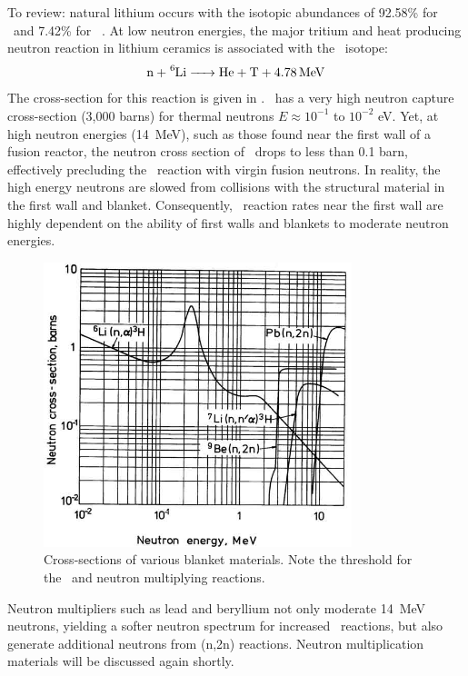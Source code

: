 \documentclass[11pt]{report} %
\newcommand{\lisev}{\ce{^7Li}}
\newcommand{\lisix}{\ce{^6Li}}
\begin{document}
To review: natural lithium occurs with the isotopic abundances of 92.58\% for \lisev~and 7.42\% for \lisix~. At low neutron energies, the major tritium and heat producing neutron reaction in lithium ceramics is associated with the \lisix~isotope:
\begin{align}
\ce{n + ^6Li -> He + T} + \SI{4.78}{\mega\electronvolt} \label{eq:Li6T}
\end{align}
The cross-section for this reaction is given in . \lisix~has a very high neutron capture cross-section (3,000 barns) for thermal neutrons $E \approx 10^{-1}$ to $10^{-2}$ eV. Yet, at high neutron energies (\SI{14}{\mega\electronvolt}), such as those found near the first wall of a fusion reactor, the neutron cross section of \lisix~drops to less than 0.1 barn, effectively precluding the \lisix~reaction with virgin fusion neutrons. In reality, the high energy neutrons are slowed from collisions with the structural material in the first wall and blanket. Consequently, \lisix~reaction rates near the first wall are highly dependent on the ability of first walls and blankets to moderate neutron energies.

\begin{figure}[ht]
\centering
\includegraphics[width=0.8\textwidth]{../images/breeding_xsecs} 
\caption{Cross-sections of various blanket materials. Note the threshold for the \lisev~and neutron multiplying reactions.}
\label{fig:xsects}
\end{figure}

Neutron multipliers such as lead and beryllium not only moderate \SI{14}{\mega\electronvolt} neutrons, yielding a softer neutron spectrum for increased \lisix~reactions, but also generate additional neutrons from (n,2n) reactions. Neutron multiplication materials will be discussed again shortly.
\end{document}
